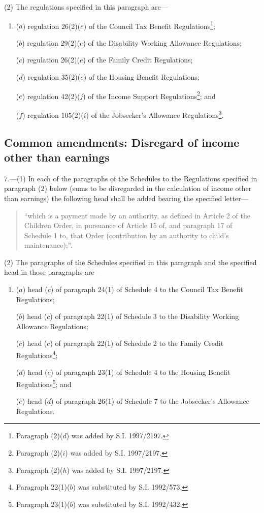 \documentclass[12pt,a4paper]{article}
\begin{document}
(2) The regulations specified in this paragraph are—
\begin{enumerate}\item[]
($a$) regulation 26(2)($e$)  of the Council Tax Benefit Regulations\footnote{\frenchspacing Paragraph (2)($d$) was added by S.I. 1997/2197.\label{fn:6(2)(a)}};

($b$) regulation 29(2)($e$)  of the Disability Working Allowance Regulations;

($c$) regulation 26(2)($e$)  of the Family Credit Regulations;

($d$) regulation 35(2)($e$)  of the Housing Benefit Regulations;

($e$) regulation 42(2)($j$)  of the Income Support Regulations\footnote{\frenchspacing Paragraph (2)($i$) was added by S.I. 1997/2197.}; and

($f$) regulation 105(2)($i$)  of the Jobseeker’s Allowance Regulations\footnote{\frenchspacing Paragraph (2)($h$) was added by S.I. 1997/2197.}.
\end{enumerate}

\subsection[7. Common amendments: Disregard of income other than earnings]{\sloppy Common amendments: Disregard of income other than earnings}

7.---(1)  In each of the paragraphs of the Schedules to the Regulations specified in paragraph (2) below (sums to be disregarded in the calculation of income other than earnings) the following head shall be added bearing the specified letter—
\begin{quotation}
    “which is a payment made by an authority, as defined in Article 2 of the Children Order, in pursuance of Article 15 of, and paragraph 17 of Schedule 1 to, that Order (contribution by an authority to child’s maintenance);”. 
\end{quotation}

(2) The paragraphs of the Schedules specified in this paragraph and the specified head in those paragraphs are—
\begin{enumerate}\item[]
($a$) head ($c$)  of paragraph 24(1) of Schedule 4 to the Council Tax Benefit Regulations;

($b$) head ($c$)  of paragraph 22(1) of Schedule 3 to the Disability Working Allowance Regulations;

($c$) head ($c$)  of paragraph 22(1) of Schedule 2 to the Family Credit Regulations\footnote{\frenchspacing Paragraph 22(1)($b$) was substituted by S.I. 1992/573.};

($d$) head ($c$)  of paragraph 23(1) of Schedule 4 to the Housing Benefit Regulations\footnote{\frenchspacing Paragraph 23(1)($b$) was substituted by S.I. 1992/432.}; and

($e$) head ($d$)  of paragraph 26(1) of Schedule 7 to the Jobseeker’s Allowance Regulations.
\end{enumerate}
\end{document}
